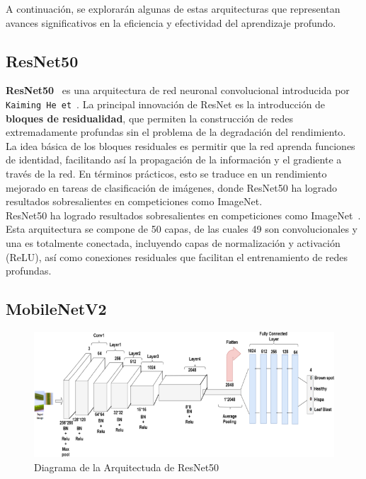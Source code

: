 A continuación, se explorarán algunas de estas arquitecturas que representan avances significativos en la eficiencia y
efectividad del aprendizaje profundo.

\subsection{ResNet50}\label{subsec:resnet50}
\textbf{ResNet50}~\cite{noauthor_resnet50_nodate} es una arquitectura de red neuronal convolucional introducida por
\texttt{Kaiming He et}~\cite{he_deep_2016}.
La principal innovación de ResNet es la introducción de \textbf{bloques de residualidad}, que permiten la construcción
de redes extremadamente profundas sin el problema de la degradación del rendimiento. \\[6pt]

La idea básica de los bloques residuales es permitir que la red aprenda funciones de identidad, facilitando así la
propagación de la información y el gradiente a través de la red.
En términos prácticos, esto se traduce en un rendimiento mejorado en tareas de clasificación de imágenes, donde
ResNet50 ha logrado resultados sobresalientes en competiciones como ImageNet. \\[6pt]

ResNet50 ha logrado resultados sobresalientes en competiciones como ImageNet~\cite{alnuaim_human-computer_2022}.
Esta arquitectura se compone de 50 capas, de las cuales 49 son convolucionales y una es totalmente conectada,
incluyendo capas de normalización y activación (ReLU), así como conexiones residuales que facilitan el entrenamiento de
redes profundas.

\subsection{MobileNetV2}\label{subsec:mobilenet}

\begin{figure}[htp] \label{fig:resnet50}
    \begin{center}
        \includegraphics[width=1\textwidth]{imagenes/resnet50}
    \end{center}
    \caption[ResNet50]{Diagrama de la Arquitectuda de ResNet50}
\end{figure}

